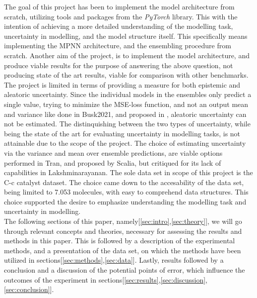 The goal of this project has been to implement the model architecture from scratch, utilizing tools and packages from the
\textit{PyTorch} library. This with the intention of achieving a more detailed understanding of the modelling task, uncertainty in modelling,
and the model structure itself. This specifically means implementing the MPNN architecture\cite{PAINN}, and the ensembling procedure from
scratch. Another aim of the project, is to implement the model architecture, and produce viable results for the purpose of answering the
above question, not producing state of the art results, viable for comparison with other benchmarks. 
The project is limited in terms of providing a measure for both epistemic and aleatoric uncertainty. Since the individual models in the ensembles
only predict a single value, trying to minimize the MSE-loss function, and not an output mean and variance like done in Busk2021\cite{Busk2021}, and
proposed in \cite{Lakshminarayanan2016}, aleatoric uncertainty can not be estimated. The distinquishing between the two types of uncertainty,
while being the state of the art for evaluating uncertainty in modelling tasks, is not attainable due to the scope of the project.
The choice of estimating uncertainty via the variance and mean over ensemble predictions, are viable options performed in Tran\cite{Tran2019},
and proposed by Scalia\cite{Scalia2019}, but critiqued for its lack of capabilities in Lakshminarayanan\cite{Lakshminarayanan2016}.
The sole data set in scope of this project is the C-c catalyst dataset\cite{Meyer2018}. The choice came down to the accesability of the data set,
being limited to 7.053 molecules, with easy to comprehend data structures. This choice supported the desire to emphasize understanding the
modelling task and uncertainty in modelling. \\

The following sections of this paper, namely[\ref{sec:intro},\ref{sec:theory}],
we will go through relevant concepts and theories, necessary for assessing the results and methods in this paper.
This is followed by a description of the experimental methods, and a presentation of the data set,
on which the methods have been utilized in sections[\ref{sec:methods},\ref{sec:data}].
Lastly, results followed by a conclusion and a discussion of the potential points of error,
which influence the outcomes of the experiment in sections[\ref{sec:results},\ref{sec:discussion},\ref{sec:conclusion}].

\newpage


